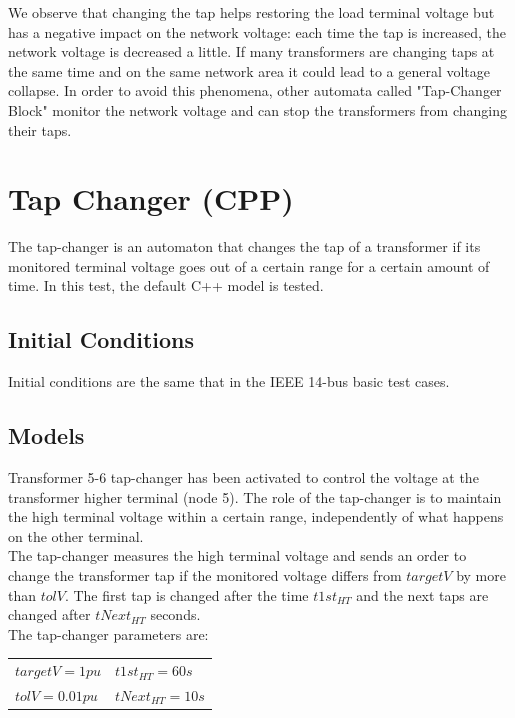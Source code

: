 \documentclass[a4paper, 12pt]{report}
\begin{document}
We observe that changing the tap helps restoring the load terminal voltage but has a negative impact on the network voltage: each time the tap is increased, the network voltage is decreased a little. If many transformers are changing taps at the same time and on the same network area it could lead to a general voltage collapse. In order to avoid this phenomena, other automata called "Tap-Changer Block" monitor the network voltage and can stop the transformers from changing their taps.


\newpage
\section{Tap Changer (CPP)}
\label{TapChangerAutomatonCpp}

The tap-changer is an automaton that changes the tap of a transformer if its monitored terminal voltage goes out of a certain range for a certain amount of time. In this test, the default C++ model is tested.

\subsection{Initial Conditions}

Initial conditions are the same that in the IEEE 14-bus basic test cases.

\subsection{Models}

Transformer 5-6 tap-changer has been activated to control the voltage at the transformer higher terminal (node 5). The role of the tap-changer is to maintain the high terminal voltage within a certain range, independently of what happens on the other terminal. \\

The tap-changer measures the high terminal voltage and sends an order to change the transformer tap if the monitored voltage differs from $targetV$ by more than $tolV$. The first tap is changed after the time $t1st_{HT}$ and the next taps are changed after $tNext_{HT}$ seconds.\\

The tap-changer parameters are:
\begin{center}
\begin{tabular}{l|l}
   $targetV=1pu$ & $t1st_{HT}=60s$ \\
   $tolV=0.01pu$  & $tNext_{HT}=10s$ \\
\end{tabular}
\end{center}
\end{document}
